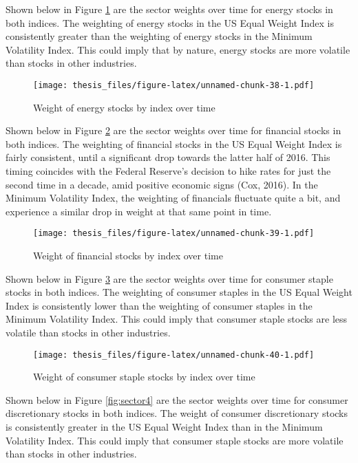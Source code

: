 \documentclass[12pt,twoside]{reedthesis}
\theoremstyle{definition}
\theoremstyle{definition}
\theoremstyle{definition}
\theoremstyle{remark}
\begin{document}
Shown below in Figure \ref{fig:sector1} are the sector weights over time
for energy stocks in both indices. The weighting of energy stocks in the
US Equal Weight Index is consistently greater than the weighting of
energy stocks in the Minimum Volatility Index. This could imply that by
nature, energy stocks are more volatile than stocks in other industries.
\begin{figure}[htbp]
\centering
\texttt{[image: thesis\_files/figure-latex/unnamed-chunk-38-1.pdf]}
\caption{\label{fig:unnamed-chunk-38}Weight of energy stocks by index over
time\label{fig:sector1}}
\end{figure}
\clearpage
Shown below in Figure \ref{fig:sector2} are the sector weights over time
for financial stocks in both indices. The weighting of financial stocks
in the US Equal Weight Index is fairly consistent, until a significant
drop towards the latter half of 2016. This timing coincides with the
Federal Reserve's decision to hike rates for just the second time in a
decade, amid positive economic signs (Cox, 2016). In the Minimum
Volatility Index, the weighting of financials fluctuate quite a bit, and
experience a similar drop in weight at that same point in time.
\begin{figure}[htbp]
\centering
\texttt{[image: thesis\_files/figure-latex/unnamed-chunk-39-1.pdf]}
\caption{\label{fig:unnamed-chunk-39}Weight of financial stocks by index
over time\label{fig:sector2}}
\end{figure}
\newline
Shown below in Figure \ref{fig:sector3} are the sector weights over time
for consumer staple stocks in both indices. The weighting of consumer
staples in the US Equal Weight Index is consistently lower than the
weighting of consumer staples in the Minimum Volatility Index. This
could imply that consumer staple stocks are less volatile than stocks in
other industries.
\begin{figure}[htbp]
\centering
\texttt{[image: thesis\_files/figure-latex/unnamed-chunk-40-1.pdf]}
\caption{\label{fig:unnamed-chunk-40}Weight of consumer staple stocks by
index over time\label{fig:sector3}}
\end{figure}
\clearpage
Shown below in Figure \ref{fig:sector4} are the sector weights over time
for consumer discretionary stocks in both indices. The weight of
consumer discretionary stocks is consistently greater in the US Equal
Weight Index than in the Minimum Volatility Index. This could imply that
consumer staple stocks are more volatile than stocks in other
industries.
\end{document}
